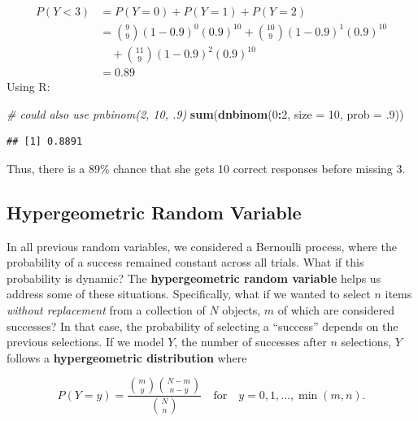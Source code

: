 \documentclass[
]{krantz}
\newenvironment{Shaded}{\begin{snugshade}}{\end{snugshade}}
\newcommand{\CommentTok}[1]{\textcolor[rgb]{0.37,0.37,0.37}{\textit{#1}}}
\newcommand{\DataTypeTok}[1]{\textcolor[rgb]{0.27,0.27,0.27}{#1}}
\newcommand{\DecValTok}[1]{\textcolor[rgb]{0.06,0.06,0.06}{#1}}
\newcommand{\FloatTok}[1]{\textcolor[rgb]{0.06,0.06,0.06}{#1}}
\newcommand{\KeywordTok}[1]{\textcolor[rgb]{0.27,0.27,0.27}{\textbf{#1}}}
\newcommand{\NormalTok}[1]{#1}
\newcommand{\OperatorTok}[1]{\textcolor[rgb]{0.43,0.43,0.43}{\textbf{#1}}}
\begin{document}
\begin{align*}
 P(Y < 3) &= P(Y=0) + P(Y=1) + P(Y=2) \\
          &= \binom{9}{9}(1-0.9)^0 (0.9)^{10} + \binom{10}{9}(1-0.9)^1 (0.9)^{10} \\
          & \quad + \binom{11}{9}(1-0.9)^2 (0.9)^{10} \\
          &= 0.89
\end{align*}
Using R:

\begin{Shaded}
\begin{Highlighting}[]
\CommentTok{# could also use pnbinom(2, 10, .9)}
\KeywordTok{sum}\NormalTok{(}\KeywordTok{dnbinom}\NormalTok{(}\DecValTok{0}\OperatorTok{:}\DecValTok{2}\NormalTok{, }\DataTypeTok{size =} \DecValTok{10}\NormalTok{, }\DataTypeTok{prob =} \FloatTok{.9}\NormalTok{))  }
\end{Highlighting}
\end{Shaded}

\begin{verbatim}
## [1] 0.8891
\end{verbatim}

Thus, there is a 89\% chance that she gets 10 correct responses before missing 3.

\hypertarget{hypergeometric-random-variable}{%
\subsection{Hypergeometric Random Variable}\label{hypergeometric-random-variable}}

In all previous random variables, we considered a Bernoulli process, where the probability of a success remained constant across all trials. What if this probability is dynamic? The \textbf{hypergeometric random variable} helps us address some of these situations. Specifically, what if we wanted to select \(n\) items \emph{without replacement} from a collection of \(N\) objects, \(m\) of which are considered successes? In that case, the probability of selecting a ``success'' depends on the previous selections.
If we model \(Y\), the number of successes after \(n\) selections, \(Y\) follows a \textbf{hypergeometric distribution}  where

\begin{equation}
P(Y=y) = \frac{\binom{m}{y} \binom{N-m}{n-y}}{\binom{N}{n}} \quad \textrm{for} \quad y = 0, 1, \ldots, \min(m,n).
\label{eq:hyperGeoRV}
\end{equation}
\end{document}

